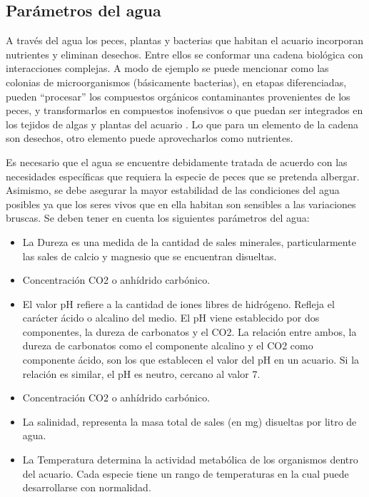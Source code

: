 \subsection{Parámetros del agua}

A través del agua los peces, plantas y bacterias que habitan el acuario incorporan nutrientes y eliminan desechos. Entre ellos se conformar una cadena biológica con interacciones complejas. A modo de ejemplo se puede mencionar como las colonias de microorganismos (básicamente bacterias), en etapas diferenciadas, pueden ``procesar'' los compuestos orgánicos contaminantes provenientes de los peces, y transformarlos en compuestos inofensivos o que puedan ser integrados en los tejidos de algas y plantas del acuario \citep{teton2003}.   Lo que para un elemento de la cadena son desechos, otro elemento puede aprovecharlos como nutrientes.

Es necesario que el agua se encuentre debidamente tratada de acuerdo con las necesidades específicas que requiera la especie de peces que se pretenda albergar.  Asimismo, se debe asegurar la mayor estabilidad de las condiciones del agua posibles ya que los seres vivos que en ella habitan son sensibles a las variaciones bruscas.  Se deben tener en cuenta los siguientes parámetros del agua:

\begin{itemize}
		\item La Dureza es una medida de la cantidad de sales minerales, particularmente las sales de calcio y magnesio que se encuentran disueltas.
		\item Concentración CO2  o anhídrido carbónico.
		\item El valor pH refiere a la cantidad de iones libres de hidrógeno. Refleja el carácter ácido o alcalino del medio. El pH viene establecido por dos componentes, la dureza de carbonatos y el CO2. La relación entre ambos, la dureza de carbonatos como el componente alcalino y el CO2 como componente ácido, son los que establecen el valor del pH en un acuario. Si la relación es similar, el pH es neutro, cercano al valor 7.
		\item Concentración CO2  o anhídrido carbónico.
		\item La salinidad, representa la masa total de sales (en mg) disueltas por litro de agua.
		\item La Temperatura determina la actividad metabólica de los organismos dentro del acuario.  Cada especie tiene un rango de temperaturas en la cual puede desarrollarse con normalidad.
\end{itemize}

